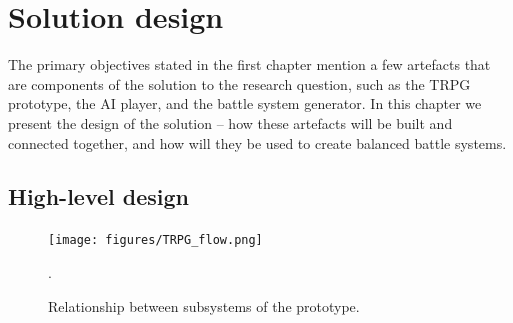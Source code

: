 \chapter{Solution design}

The primary objectives stated in the first chapter mention a few artefacts that are components of the solution to the research question, such as the TRPG prototype, the AI player, and the battle system generator. In this chapter we present the design of the solution -- how these artefacts will be built and connected together, and how will they be used to create balanced battle systems.

\section{High-level design}

\begin{figure}
	\centering
	\texttt{[image: figures/TRPG\_flow.png]}
	\caption{Relationship between subsystems of the prototype.}.
	\label{fig:flow}
\end{figure}

